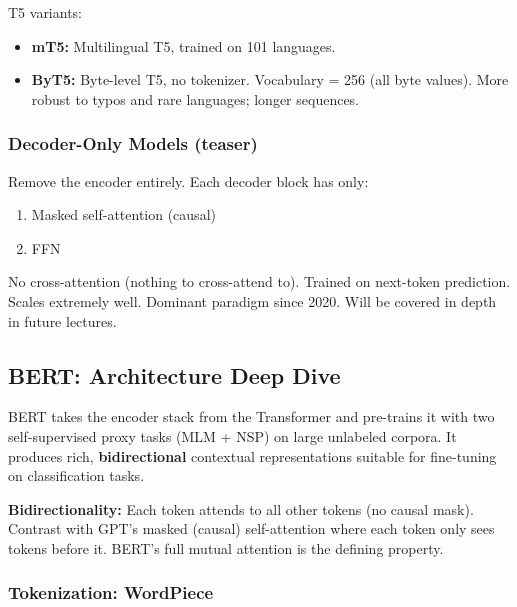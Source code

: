\documentclass[11pt, a4paper]{article}
\begin{document}
T5 variants:
\begin{itemize}[leftmargin=2em]
  \item \textbf{mT5:} Multilingual T5, trained on 101 languages.
  \item \textbf{ByT5:} Byte-level T5, no tokenizer. Vocabulary = 256 (all byte values). More robust to typos and rare languages; longer sequences.
\end{itemize}

\subsubsection{Decoder-Only Models (teaser)}

Remove the encoder entirely. Each decoder block has only:
\begin{enumerate}[leftmargin=2em]
  \item Masked self-attention (causal)
  \item FFN
\end{enumerate}
No cross-attention (nothing to cross-attend to). Trained on next-token prediction. Scales extremely well. Dominant paradigm since 2020. Will be covered in depth in future lectures.

\subsection{BERT: Architecture Deep Dive}

\begin{defbox}[BERT = Bidirectional Encoder Representations from Transformers (Devlin et al., 2018)]
BERT takes the encoder stack from the Transformer and pre-trains it with two self-supervised proxy tasks (MLM + NSP) on large unlabeled corpora. It produces rich, \textbf{bidirectional} contextual representations suitable for fine-tuning on classification tasks.
\end{defbox}

\textbf{Bidirectionality:} Each token attends to all other tokens (no causal mask). Contrast with GPT's masked (causal) self-attention where each token only sees tokens before it. BERT's full mutual attention is the defining property.

\subsubsection{Tokenization: WordPiece}
\end{document}
